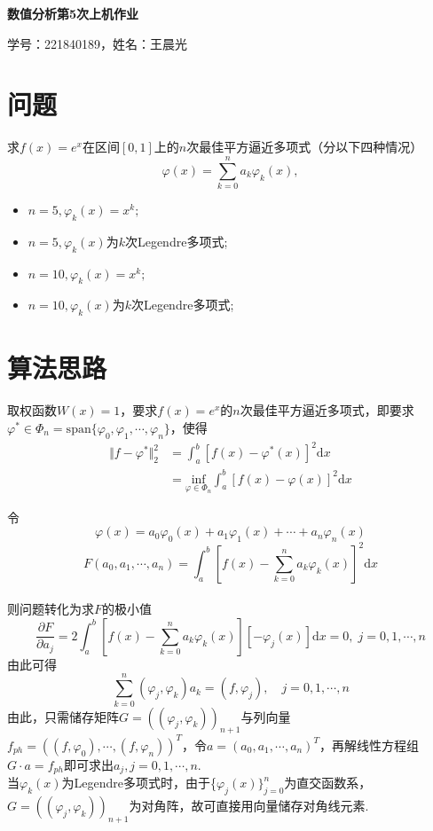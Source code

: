 \documentclass[UTF8,ctexart,a4paper,11pt,openany]{article}
\theoremstyle{definition}
\begin{document}
\begin{center}
{\huge \textbf{数值分析第5次上机作业}}

{\large 学号：221840189，姓名：王晨光}
\end{center}

\section{问题}
    求$f(x)=e^x$在区间$[0,1]$上的$n$次最佳平方逼近多项式（分以下四种情况）$$\varphi (x)=\sum_{k=0}^{n}a_k\varphi_k(x),$$
    \begin{itemize}
        \item $n=5,\varphi_k(x)=x^k;$
        \item $n=5,\varphi_k(x)$为$k$次Legendre多项式;
        \item $n=10,\varphi_k(x)=x^k;$
        \item $n=10,\varphi_k(x)$为$k$次Legendre多项式;
    \end{itemize}
\section{算法思路}
取权函数$W(x)=1$，要求$f(x)=e^x$的$n$次最佳平方逼近多项式，即要求$\varphi^* \in \Phi_n =\mathrm{span}\{ \varphi_0,\varphi_1,\cdots,\varphi_n \}$，使得
\begin{align*}
      \Vert f-\varphi^* \Vert_2^2 &=\int_{a}^{b}[f(x)-\varphi^*(x)]^2 \mathrm{d}x\\
      &=\underset{\varphi \in \Phi_n}{\mathrm{inf} }\int_{a}^{b}[f(x)-\varphi(x)]^2 \mathrm{d}x
\end{align*} 

令$$\varphi(x)=a_0\varphi_0(x)+a_1 \varphi_1(x)+\cdots+a_n \varphi_n(x)$$
$$F(a_0,a_1,\cdots,a_n)=\int_{a}^{b}[f(x)-\sum_{k=0}^n a_k \varphi_k(x)]^2 \mathrm{d}x$$
\\则问题转化为求$F$的极小值
$$
\dfrac{\partial F}{\partial a_j}=2 \int_{a}^{b}[f(x)-\sum_{k=0}^n a_k \varphi_k(x)][-\varphi_j(x)] \mathrm{d}x=0,\;j=0,1,\cdots,n
$$
由此可得
\[
    \sum_{k=0}^n(\varphi_j,\varphi_k)a_k=(f,\varphi_j),\quad j=0,1,\cdots,n
\]
由此，只需储存矩阵$G=((\varphi_j,\varphi_k))_{n+1}$与列向量$f_{ph}=((f,\varphi_0),\cdots,(f,\varphi_n))^T$，令$a=(a_0,a_1,\cdots,a_n)^T$，再解线性方程组$G\cdot a = f_{ph}$即可求出$a_j,j=0,1,\cdots,n$. \\ \indent
当$\varphi_k(x)$为Legendre多项式时，由于\{$\varphi_j(x)\}_{j=0}^n$为直交函数系，$G=((\varphi_j,\varphi_k))_{n+1}$为对角阵，故可直接用向量储存对角线元素.
\end{document}
